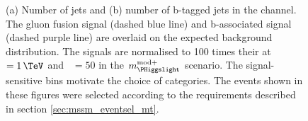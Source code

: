 \begin{figure}[h!]
\begin{center}
\end{center}
\caption[Number of jets and number of b-tagged jets in the \mutau channel, 
with the signal overlaid.]{(a) Number of jets and (b) number of b-tagged jets in the \mutau channel. The gluon fusion signal (dashed
blue line) and b-associated signal (dashed purple line) are overlaid on the expected background distribution. The signals
are normalised to 100 times their \xsbr at \mA~$=1\,\TeV$ and \tanb~$=50$ in the $m_{\PHiggslight}^{\text{mod+}}$
scenario. The signal-sensitive bins motivate the choice of categories. The events shown in these
figures were selected according to the requirements described in section \ref{sec:mssm_eventsel_mt}.}
\label{fig:mssm_cats_mt}
\end{figure}


